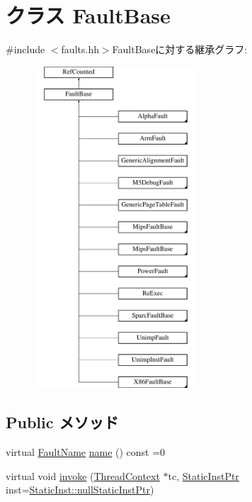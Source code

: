 \hypertarget{classFaultBase}{
\section{クラス FaultBase}
\label{classFaultBase}
}


{\ttfamily \#include $<$faults.hh$>$}FaultBaseに対する継承グラフ:\begin{figure}[H]
\begin{center}
\leavevmode
\includegraphics[height=12cm]{classFaultBase}
\end{center}
\end{figure}
\subsection*{Public メソッド}
\begin{DoxyCompactItemize}
\item 
virtual \hyperlink{sim_2faults_8hh_abb196df64725e5c2568c900cf130d8d7}{FaultName} \hyperlink{classFaultBase_aad960357563b8b969d2dffdcc6861de7}{name} () const =0
\item 
virtual void \hyperlink{classFaultBase_a2bd783b42262278d41157d428e1f8d6f}{invoke} (\hyperlink{classThreadContext}{ThreadContext} $\ast$tc, \hyperlink{classRefCountingPtr}{StaticInstPtr} inst=\hyperlink{classStaticInst_aa793d9793af735f09096369fb17567b6}{StaticInst::nullStaticInstPtr})
\end{DoxyCompactItemize}


